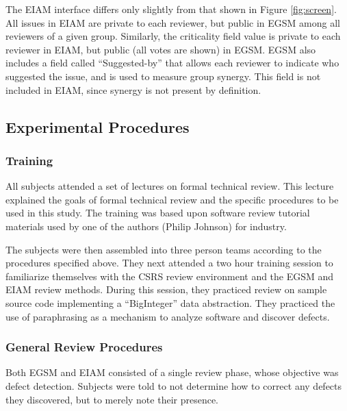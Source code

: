 \begin{figure*}[htb]
{\centerline {}}
 \caption{An EGSM screen image from the ICS-411 round.}
 \label{fig:screen}
\end{figure*}


The EIAM interface differs only slightly from that shown in Figure
\ref{fig:screen}.  All issues in EIAM are private to each reviewer, but
public in EGSM among all reviewers of a given group. Similarly, the
criticality field value is private to each reviewer in EIAM, but public
(all votes are shown) in EGSM. EGSM also includes a field called
``Suggested-by'' that allows each reviewer to indicate who suggested the
issue, and is used to measure group synergy. This field is not included in
EIAM, since synergy is not present by definition.



\subsection{Experimental Procedures}

\subsubsection{Training}

All subjects attended a set of lectures on formal technical review. This
lecture explained the goals of formal technical review and the specific
procedures to be used in this study.  The training was based upon software
review tutorial materials used by one of the authors (Philip Johnson) for industry. 

The subjects were then assembled into three person teams according to the
procedures specified above. They next attended a two hour training
session to familiarize themselves with the CSRS review environment and the
EGSM and EIAM review methods. During this session, they practiced review on
sample source code implementing a ``BigInteger'' data abstraction. They
practiced the use of paraphrasing as a mechanism to analyze software and
discover defects.

\subsubsection{General Review Procedures}

Both EGSM and EIAM consisted of a single review phase, whose objective was
defect detection.  Subjects were told to not determine how to correct any
defects they discovered, but to merely note their presence.  

